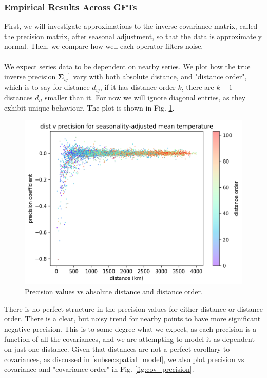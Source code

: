 \documentclass[12pt,a4paper]{article} %
\begin{document}
\subsubsection{Empirical Results Across GFTs}
\label{subsec:GFT_comparison}
First, we will investigate approximations to the inverse covariance matrix, called the precision matrix, after seasonal adjustment, so that the data is approximately normal. Then, we compare how well each operator filters noise.\\\\
We expect series data to be dependent on nearby series. We plot how the true inverse precision $\pmb{\Sigma}_{ij}^{-1}$ vary with both absolute distance, and "distance order", which is to say for distance $d_{ij}$, if it has distance order $k$, there are $k-1$ distances $d_{il}$ smaller than it. For now we will ignore diagonal entries, as they exhibit unique behaviour. The plot is shown in Fig. \ref{fig:precision}.
\begin{figure}[!ht]
    \centering
    \includegraphics[width=.8\linewidth]{mean_nearest_error_precision_by_dist.png}
    \caption{Precision values vs absolute distance and distance order.}
    \label{fig:precision}
\end{figure}
There is no perfect structure in the precision values for either distance or distance order. There is a clear, but noisy trend for nearby points to have more significant negative precision. This is to some degree what we expect, as each precision is a function of all the covariances, and we are attempting to model it as dependent on just one distance. Given that distances are not a perfect corollary to covariances, as discussed in \ref{subsec:spatial_model}, we also plot precision vs covariance and "covariance order" in Fig. \ref{fig:cov_precision}.
\end{document}
